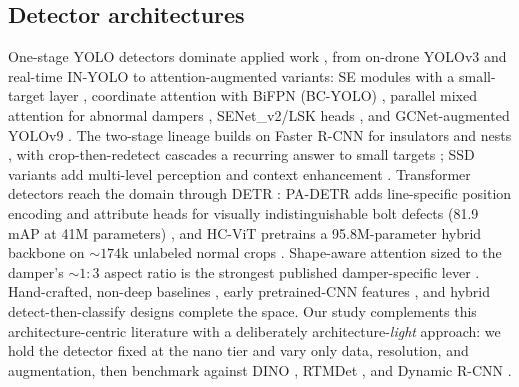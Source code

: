 \documentclass[conference]{IEEEtran}
\begin{document}
\subsection{Detector architectures}
One-stage YOLO detectors \cite{redmon2016yolo,bochkovskiy2020yolov4,jocher2023ultralytics} dominate applied work \cite{faisal2025powerline}, from on-drone YOLOv3 \cite{siddiqui2020drone} and real-time IN-YOLO \cite{sadykova2020inyolo} to attention-augmented variants: SE modules with a small-target layer \cite{yuan2023yolov5tl}, coordinate attention with BiFPN (BC-YOLO) \cite{bao2022bcyolo}, parallel mixed attention for abnormal dampers \cite{bao2021pmayolo}, SENet\_v2/LSK heads \cite{zhang2024slyolov8}, and GCNet-augmented YOLOv9 \cite{pradeep2025insulator}. The two-stage lineage builds on Faster R-CNN \cite{ren2017faster} for insulators and nests \cite{zhao2019insulator,lei2019faultdetection,li2020birdnesttower,li2020birdnestuav,zhao2021insulator,liang2020wire10}, with crop-then-redetect cascades a recurring answer to small targets \cite{tao2020insulator,han2020eagle,ling2019selfblast,wen2021insulator}; SSD variants add multi-level perception and context enhancement \cite{jiang2019ensemble,miao2019insulator,maduako2022felect,su2024cessd}. Transformer detectors reach the domain through DETR \cite{carion2020detr}: PA-DETR adds line-specific position encoding and attribute heads for visually indistinguishable bolt defects (81.9 mAP at 41M parameters) \cite{zhang2023padetr}, and HC-ViT pretrains a 95.8M-parameter hybrid backbone on ${\sim}174$k unlabeled normal crops \cite{zhang2024hcvit}. Shape-aware attention sized to the damper's ${\sim}1{:}3$ aspect ratio is the strongest published damper-specific lever \cite{zhang2024dsanet}. Hand-crafted, non-deep baselines \cite{liao2015insulator,huang2023damper}, early pretrained-CNN features \cite{zhao2016multipatch}, and hybrid detect-then-classify designs \cite{souza2023hybridyolo,zhang2022agmnet,liu2021slippage} complete the space. Our study complements this architecture-centric literature with a deliberately architecture-\emph{light} approach: we hold the detector fixed at the nano tier and vary only data, resolution, and augmentation, then benchmark against DINO \cite{zhang2023dino}, RTMDet \cite{lyu2022rtmdet}, and Dynamic R-CNN \cite{zhang2020dynamicrcnn}.
\end{document}
